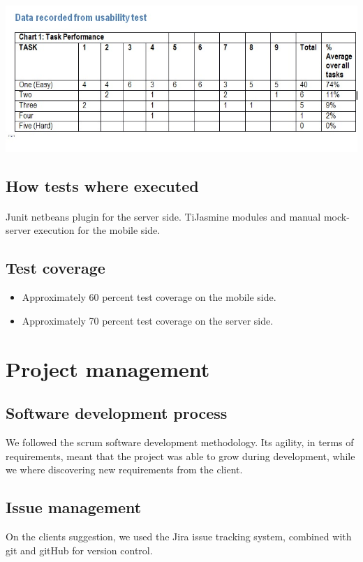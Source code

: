 \documentclass[10pt,a4paper]{article}
\begin{document}
\paragraph{}
\includegraphics[scale=0.55]{Pictures/results.jpg}
\subsection{How tests where executed}
\paragraph{}
Junit netbeans plugin for the server side.
TiJasmine modules and manual mock-server execution for the mobile side.   
\subsection{Test coverage}
\begin{itemize}
\item Approximately 60 percent test coverage on the mobile side.
\item Approximately 70 percent test coverage on the server side. 
\end{itemize}

\section{Project management}
\subsection{Software development process}
We followed the scrum software development methodology. Its agility, in terms of requirements, meant that the project was able to grow during development, while we where discovering new requirements from the client.
\subsection{Issue management}
On the clients suggestion, we used the Jira issue tracking system, combined with git and gitHub for version control.
\pagebreak
\end{document}
